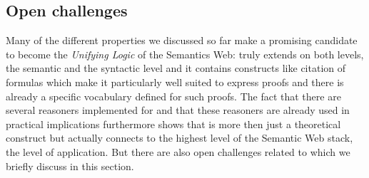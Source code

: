 





\subsection{Open challenges}
Many of the different properties we discussed so far make \nthree a promising candidate to become the \emph{Unifying Logic} of the Semantics Web: \nthree truly extends \rdf on both 
levels, the semantic and the syntactic level and it contains constructs like citation of formulas which make it particularly well suited to express  proofs and there is already a specific vocabulary defined for such proofs.
The fact that there are several reasoners implemented for \nthree and that these reasoners are already used in practical implications furthermore shows that \nthreelogic is more then just a theoretical construct but actually connects to the highest level of the Semantic Web stack, 
the level of application. But there are also open challenges related to \nthree which we briefly discuss in this section.

